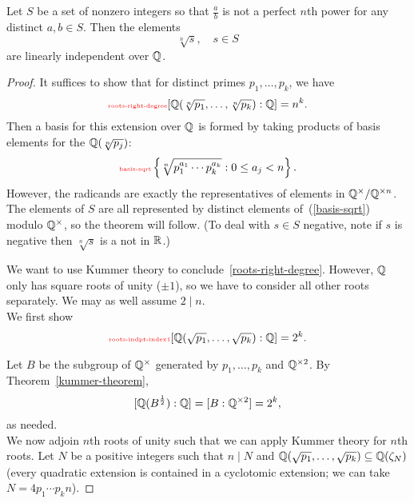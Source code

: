 \begin{cor}
Let $S$ be a set of nonzero integers so that $\frac{a}{b}$ is not a perfect $n$th power for any distinct $a,b\in S$. Then the elements
\[
\sqrt[n]{s},\quad s\in S
\]
are linearly independent over $\mathbb{Q}$.
\end{cor}
\begin{proof}
It suffices to show that for distinct primes $p_1,\ldots, p_k$, we have
\begin{equation}\llabel{roots-right-degree}
[\Q(\sqrt[n]{p_1},\ldots, \sqrt[n]{p_k}):\Q]=n^k.
\end{equation}
Then a basis for this extension over $\mathbb{Q}$ is formed by taking products of basis elements for the $\mathbb{Q}(\sqrt[n]{p_j})$:
\begin{equation}\llabel{basis-sqrt}
\set{
\sqrt[n]{p_1^{a_1}\cdots p_k^{a_k}
}}{0\le a_j<n}.
\end{equation}
However, the radicands are exactly the representatives of elements in $\mathbb{Q}^{\times}/\mathbb{Q}^{\times n}$. The elements of $S$ are all represented by distinct elements of~(\ref{basis-sqrt}) modulo $\mathbb{Q}^{\times}$, so the theorem will follow. (To deal with $s\in S$ negative, note if $s$ is negative then $\sqrt[n]{s}$ is a not in $\mathbb{R}$.) 

We want to use Kummer theory to conclude~\eqref{roots-right-degree}. However, $\mathbb{Q}$ only has square roots of unity ($\pm1$), so we have to consider all other roots separately. We may as well assume $2\mid n$.\\

 We first show
\begin{equation}\llabel{roots-indpt-index1}
[\Q(\sqrt{p_1},\ldots, \sqrt{p_k}):\Q]=2^k.
\end{equation}

Let $B$ be the subgroup of $\mathbb{Q}^{\times}$ generated by $p_1,\ldots, p_k$ and $\mathbb{Q}^{\times 2}$. %
By Theorem~\ref{kummer-theorem}, 
\[
[\mathbb{Q}(B^{\frac{1}{2}}):\mathbb{Q}]=[B:\mathbb{Q}^{\times 2}]=2^k,
\]
as needed.\\

 We now adjoin $n$th roots of unity such that we can apply Kummer theory for $n$th roots. Let $N$ be a positive integers such that $n\mid N$ and $\mathbb{Q}(\sqrt{p_1},\ldots, \sqrt{p_k})\subseteq\mathbb{Q}(\zeta_N)$ (every quadratic extension is contained in a cyclotomic extension; we can take $N=4p_1\cdots p_k n$).


\end{proof}
